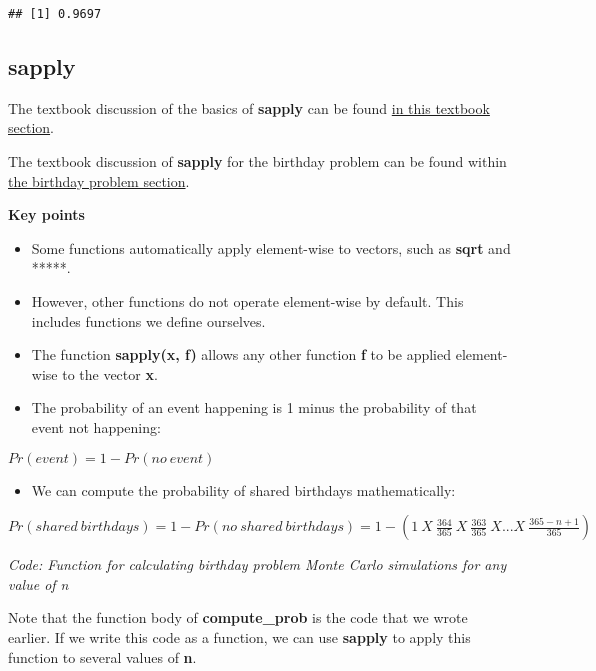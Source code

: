\documentclass[
]{article}
\providecommand{\tightlist}{%
  \setlength{\itemsep}{0pt}\setlength{\parskip}{0pt}}
\begin{document}
\begin{verbatim}
## [1] 0.9697
\end{verbatim}

\hypertarget{sapply}{%
\subsection{sapply}\label{sapply}}

The textbook discussion of the basics of \textbf{sapply} can be found
\href{https://rafalab.github.io/dsbook/programming-basics.html\#vectorization}{in
this textbook section}.

The textbook discussion of \textbf{sapply} for the birthday problem can
be found within
\href{https://rafalab.github.io/dsbook/probability.html\#birthday-problem}{the
birthday problem section}.

\textbf{Key points}

\begin{itemize}
\tightlist
\item
  Some functions automatically apply element-wise to vectors, such as
  \textbf{sqrt} and *****.
\item
  However, other functions do not operate element-wise by default. This
  includes functions we define ourselves.
\item
  The function \textbf{sapply(x, f)} allows any other function
  \textbf{f} to be applied element-wise to the vector \textbf{x}.
\item
  The probability of an event happening is 1 minus the probability of
  that event not happening:
\end{itemize}

\(Pr(event) = 1 - Pr(no\:event)\)

\begin{itemize}
\tightlist
\item
  We can compute the probability of shared birthdays mathematically:
\end{itemize}

\(Pr(shared\:birthdays) = 1 − Pr(no\:shared\:birthdays) = 1 − (1\:X\: \frac{364}{365}\:X \:\frac{363}{365}\:X...X\: \frac{365−n+1}{365})\)

\emph{Code: Function for calculating birthday problem Monte Carlo
simulations for any value of n}

Note that the function body of \textbf{compute\_prob} is the code that
we wrote earlier. If we write this code as a function, we can use
\textbf{sapply} to apply this function to several values of \textbf{n}.
\end{document}
